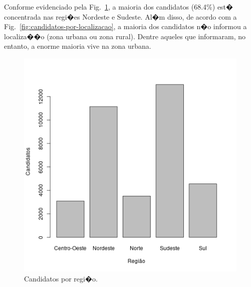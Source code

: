 \documentclass[12pt]{article}
\newcommand{\reffig}[1]{Fig.~\ref{fig:#1}}
\begin{document}
Conforme evidenciado pela \reffig{candidatos-por-regiao}, a maioria dos candidatos (68.4\%) est� concentrada nas regi�es Nordeste e Sudeste.
Al�m disso, de acordo com a \reffig{candidatos-por-localizacao}, a maioria dos candidatos n�o informou a localiza��o (zona urbana ou zona rural).
Dentre aqueles que informaram, no entanto, a enorme maioria vive na zona urbana.
\begin{minipage}{.5\textwidth}
    \begin{figure}[H]
    \includegraphics[width=\linewidth]{../geral_candidatos-por-regiao.png}
    \caption{Candidatos por regi�o.}
    \label{fig:candidatos-por-regiao}
    \end{figure}
\end{minipage}%
\end{document}
